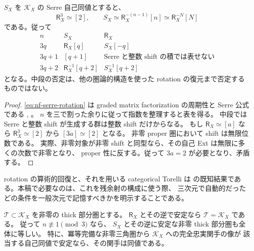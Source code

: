 \begin{proposition}
\label{prop:nf-rotation}
$S_X$ を $\mathcal K_X$ の Serre 自己同値とすると、
\begin{equation}
\label{eq:nf-serre-rotation}
 \mathsf R_X^3\simeq[2],\qquad
 S_X\simeq\mathsf R_X^{-(n-1)}[n]
          \simeq\mathsf R_X^{-N}[N]
\end{equation}
である。従って
\begin{equation}
\label{eq:nf-rotation-cases}
 \begin{array}{c|c|c}
 n&S_X&\mathsf R_X\\ \hline
 3q&\mathsf R_X[q]&S_X[-q]\\
 3q+1&[q+1]&\text{Serre と整数 shift の積では表せない}\\
 3q+2&\mathsf R_X^{-1}[q+2]&S_X^{-1}[q+2]
 \end{array}
\end{equation}
となる。中段の否定は、他の圏論的構造を使った rotation の復元まで否定するものではない。
\end{proposition}

\begin{proof}
\eqref{eq:nf-serre-rotation} は graded matrix factorization の周期性と
Serre 公式である
\cite[Section~3.3, Corollary~3.18, Lemma~3.19]{NFKuznetsovFCY},
\cite[proof of Proposition~3.7]{NFLZSerre}。
$n$ を三で割った余りに従って指数を整理すると表を得る。
中段では Serre と整数 shift が生成する群は整数 shift だけからなる。
もし $\mathsf R_X\simeq[a]$ なら $\mathsf R_X^3\simeq[2]$ から $[3a]\simeq[2]$ となる。
非零 proper 圏において shift は無限位数である。
実際、非零対象が非零 shift と同型なら、その自己 Ext は無限に多くの次数で非零となり、
proper 性に反する。従って $3a=2$ が必要となり、矛盾する。
\end{proof}

rotation の算術的回復と、それを用いる categorical Torelli は
\cite[Proposition~3.7, Theorems~4.1 and~5.1]{NFLZSerre}
の既知結果である。本稿で必要なのは、これを残余射の構成に使う際、
三次元で自動的だったどの条件を一般次元で記憶すべきかを明示することである。

\begin{proposition}
\label{prop:nf-rotation-generation}
$\mathcal T\subset\mathcal K_X$ を非零の thick 部分圏とする。
$\mathsf R_X$ とその逆で安定なら $\mathcal T=\mathcal K_X$ である。
従って $n\not\equiv1\pmod3$ なら、
$S_X$ とその逆に安定な非零 thick 部分圏も全体に等しい。
特に、冪等完備な非零三角圏から $\mathcal K_X$ への完全忠実関手の像が
該当する自己同値で安定なら、その関手は同値である。
\end{proposition}

